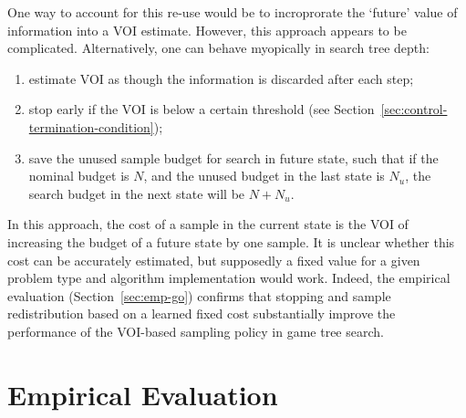 \documentclass{article}
\begin{document}
One way to account for this re-use would be to incroprorate the
`future' value of information into a VOI estimate. However, this 
approach appears to be complicated. Alternatively, one can behave
myopically in search tree depth:
\begin{enumerate}
\item estimate VOI as though the information is discarded after each step;
\item stop early if the VOI is below a certain threshold
   (see Section~\ref{sec:control-termination-condition});
\item save the unused sample budget for search in future state, such that
   if the nominal budget is $N$, and the unused budget in the last state
   is $N_u$, the search budget in the next state will be $N+N_u$.
\end{enumerate}
In this approach, the cost of a sample in the current state is the
VOI of increasing the budget of a future state by one sample.  It is
unclear whether this cost can be accurately estimated, but supposedly
a fixed value for a given problem type and algorithm implementation
would work. Indeed, the empirical evaluation (Section~\ref{sec:emp-go})
confirms that stopping and sample redistribution based on a learned
fixed cost  substantially improve the performance of the VOI-based
sampling policy in game tree search.


\section{Empirical Evaluation}
\label{sec:empirical-evaluation}
\end{document}
